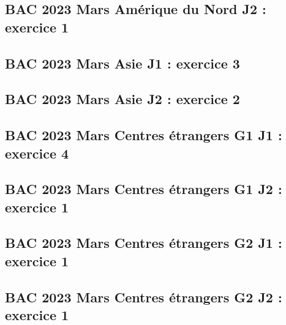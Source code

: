 \documentclass[lang=fr,edition=teacher,layout=sheet]{mxbook}
\begin{document}
\begingroup\endgroup
\par\bigskip
{}\subsection*{BAC 2023 Mars Amérique du Nord J2 : exercice 1}
\begingroup\endgroup
\par\bigskip
{}\subsection*{BAC 2023 Mars Asie J1 : exercice 3}
\begingroup\endgroup
\par\bigskip
{}\subsection*{BAC 2023 Mars Asie J2 : exercice 2}
\begingroup\endgroup
\par\bigskip
{}\subsection*{BAC 2023 Mars Centres étrangers G1 J1 : exercice 4}
\begingroup\endgroup
\par\bigskip
{}\subsection*{BAC 2023 Mars Centres étrangers G1 J2 : exercice 1}
\begingroup\endgroup
\par\bigskip
{}\subsection*{BAC 2023 Mars Centres étrangers G2 J1 : exercice 1}
\begingroup\endgroup
\par\bigskip
{}\subsection*{BAC 2023 Mars Centres étrangers G2 J2 : exercice 1}
\end{document}
